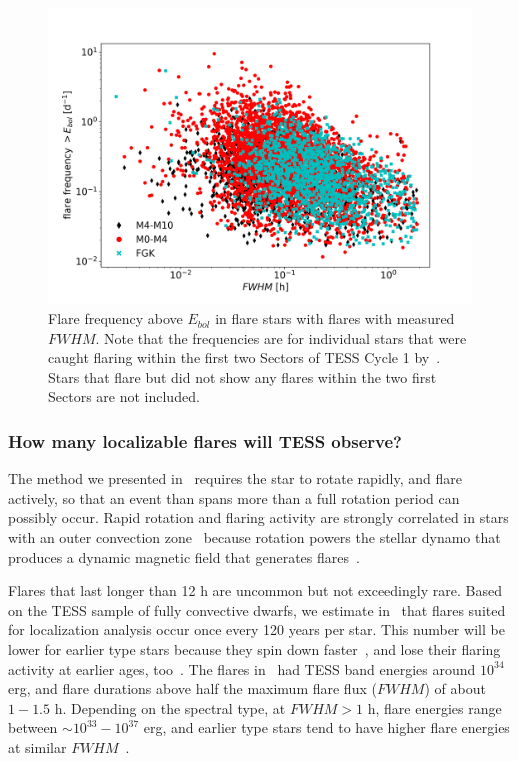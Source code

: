 \documentclass[proof]{WileyASNA-v1}
\newcommand{\jdag}[1]{\textcolor{darkred}{#1}}
\begin{document}
\begin{figure}
    \centering
    \includegraphics[width=\hsize]{guenther_repr_fwhm_freq.png}
    \caption{Flare frequency above $E_{bol}$ in flare stars with flares with measured $FWHM$. Note that the frequencies are for individual stars that were caught flaring within the first two Sectors of TESS Cycle 1 by~\citet{guenther2020}. Stars that flare but did not show any flares within the two first Sectors are not included.}
    \label{fig:guenther}
\end{figure}

\subsubsection{How many localizable flares will TESS observe?}
The method we presented in~\citet{ilin2021b} requires the star to rotate rapidly, and flare actively, so that an event than spans more than a full rotation period can possibly occur. 
Rapid rotation and flaring activity are strongly correlated in stars with an outer convection zone~\citep{doorsselaere2017} because rotation powers the stellar dynamo that produces a dynamic magnetic field that generates flares~\citep{parker1955}.%

Flares that last longer than 12 h are uncommon but not exceedingly rare.
Based on the TESS sample of fully convective dwarfs, we estimate in~\citet{ilin2021b} that flares suited for localization analysis occur once every 120 years per star. This number will be lower for earlier type stars because they spin down faster~\citep{barnes2003,reiners2008}, and lose their flaring activity at earlier ages, too~\citep{hilton2010,chang2015,ilin2019,ilin2021}. %
The flares in~\citet{ilin2021b} had TESS band energies around $10^{34}$ erg, and flare durations above half the maximum flare flux ($FWHM$) of about $1-1.5$ h. %
Depending on the spectral type, at $FWHM > 1$ h, flare energies range between $\sim 10^{33}-10^{37}$ erg, and earlier type stars tend to have higher flare energies at similar $FWHM$~\citep{guenther2020}.
\end{document}
